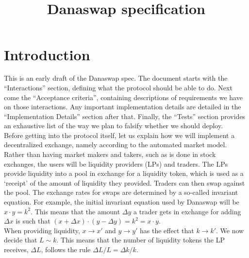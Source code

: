 \documentclass{article}
\title{Danaswap specification}
\begin{document}
\maketitle

\begingroup
  \hypersetup{hidelinks}
  \tableofcontents
\endgroup
\newpage

\section{Introduction}

This is an early draft of the Danaswap spec. The document starts with the
``Interactions'' section, defining what the protocol should be able to do. Next
come the ``Acceptance criteria'', containing descriptions of requirements we
have on those interactions. Any important implementation details are detailed in
the ``Implementation Details'' section after that. Finally, the ``Tests''
section provides an exhaustive list of the way we plan to falsify whether we
should deploy. \\

Before getting into the protocol itself, let us explain how we will implement a
decentralized exchange, namely according to the automated market model. Rather
than having market makers and takers, such as is done in stock exchanges, the
users will be liquidity providers (LPs) and traders. The LPs provide liquidity
into a pool in exchange for a liquidity token, which is used as a `receipt' of
the amount of liquidity they provided. Traders can then swap against the pool.
The exchange rates for swaps are determined by a so-called invariant equation.
For example, the initial invariant equation used by Danaswap will be $x \cdot y
= k^2$. This means that the amount $\Delta y$ a trader gets in exchange for
adding $\Delta x$ is such that $(x + \Delta x) \cdot (y - \Delta y) = k^2 = x
\cdot y$. \\

When providing liquidity, $x \rightarrow x'$ and $y \rightarrow y'$ has the
effect that $k \rightarrow k'$. We now decide that $L \sim k$. This means that
the number of liquidity tokens the LP receives, $\Delta L$, follows the rule
$\Delta L / L = \Delta k / k$. \\
\end{document}
